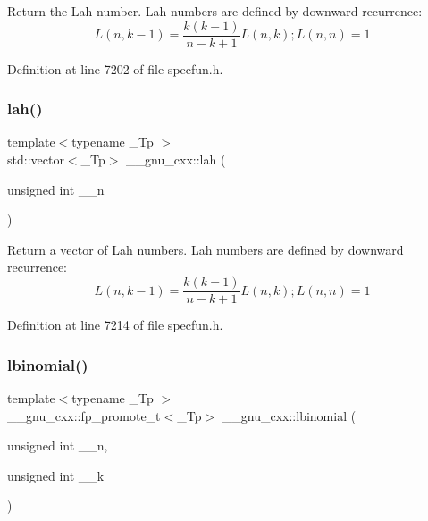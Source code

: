 Return the Lah number. Lah numbers are defined by downward recurrence\+: \[ L(n,k-1) = \frac{k(k-1)}{n-k+1}L(n,k); L(n,n) = 1 \] 

Definition at line 7202 of file specfun.\+h.

\mbox{\label{group__mathsf__gnu_ga161fe80a0d88f67a5a16ef2dcc3d4645}} 
\subsubsection{\texorpdfstring{lah()}{lah()}\hspace{0.1cm}{\footnotesize\ttfamily [2/2]}}
{\footnotesize\ttfamily template$<$typename \+\_\+\+Tp $>$ \\
std\+::vector$<$\+\_\+\+Tp$>$ \+\_\+\+\_\+gnu\+\_\+cxx\+::lah (\begin{DoxyParamCaption}\item[{unsigned int}]{\+\_\+\+\_\+n }\end{DoxyParamCaption})\hspace{0.3cm}{\ttfamily [inline]}}

Return a vector of Lah numbers. Lah numbers are defined by downward recurrence\+: \[ L(n,k-1) = \frac{k(k-1)}{n-k+1}L(n,k); L(n,n) = 1 \] 

Definition at line 7214 of file specfun.\+h.

\mbox{\label{group__mathsf__gnu_gabfa5aeba56edfa110846fc8e76963bc2}} 
\subsubsection{\texorpdfstring{lbinomial()}{lbinomial()}}
{\footnotesize\ttfamily template$<$typename \+\_\+\+Tp $>$ \\
\+\_\+\+\_\+gnu\+\_\+cxx\+::fp\+\_\+promote\+\_\+t$<$\+\_\+\+Tp$>$ \+\_\+\+\_\+gnu\+\_\+cxx\+::lbinomial (\begin{DoxyParamCaption}\item[{unsigned int}]{\+\_\+\+\_\+n,  }\item[{unsigned int}]{\+\_\+\+\_\+k }\end{DoxyParamCaption})\hspace{0.3cm}{\ttfamily [inline]}}



